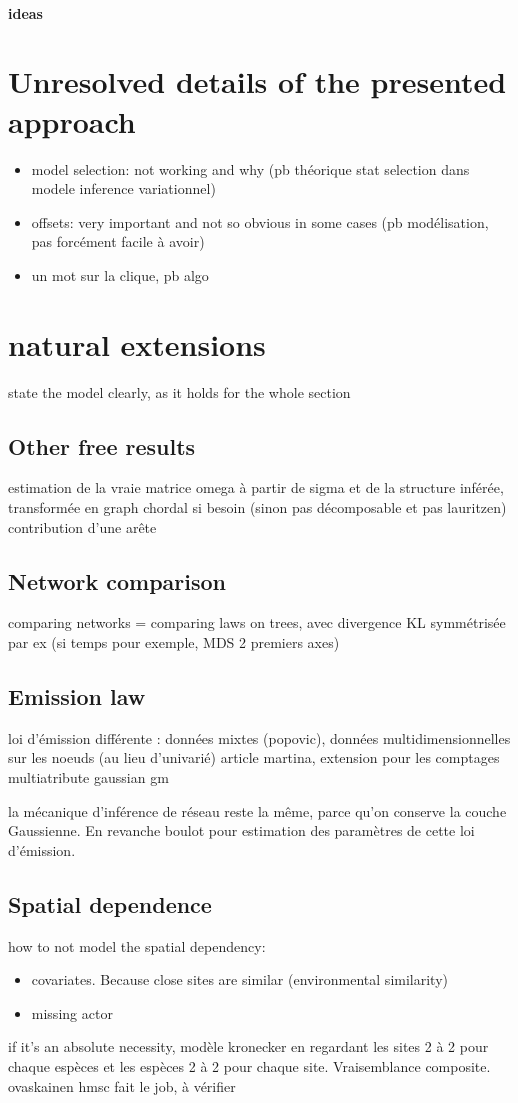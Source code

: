 \paragraph{ideas}

 
\section{Unresolved details of the presented approach}
\begin{itemize}
\item model selection: not working and why (pb théorique stat selection dans modele inference variationnel)
\item offsets: very important and not so obvious in some cases (pb modélisation, pas forcément facile à avoir)
\item un mot sur la clique, pb algo
\end{itemize} 

\section{natural extensions}
state the model clearly, as it holds for the whole section
\subsection{Other free results}
estimation de la vraie matrice omega à partir de sigma et de la structure inférée, transformée en graph chordal si besoin (sinon pas décomposable et pas lauritzen)
contribution d'une arête
\subsection{Network comparison}
comparing networks = comparing laws on trees, avec divergence KL symmétrisée par ex
(si temps pour exemple, MDS 2 premiers axes)

\subsection{Emission law}
 loi d'émission différente : données mixtes (popovic), données multidimensionnelles sur les noeuds (au lieu d'univarié) article martina, extension pour les comptages multiatribute gaussian gm
 
la mécanique d'inférence de réseau reste la même, parce qu'on conserve la couche Gaussienne. En revanche boulot pour estimation des paramètres de cette loi d'émission.

\subsection{Spatial dependence}
how to not model the spatial dependency:
\begin{itemize}
\item covariates. Because close sites are similar (environmental similarity)
\item missing actor
\end{itemize}
if it's an absolute necessity, modèle kronecker en regardant les sites 2 à 2 pour chaque espèces et les espèces 2 à 2 pour chaque site. Vraisemblance composite.
ovaskainen hmsc fait le job, à vérifier


